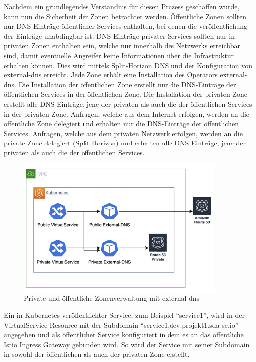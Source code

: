 Nachdem ein grundlegendes Verständnis für diesen Prozess geschaffen wurde, kann nun die Sicherheit der Zonen betrachtet werden.
Öffentliche Zonen sollten nur DNS-Einträge öffentlicher Services enthalten, bei denen die veröffentlichung der Einträge unabdingbar ist.
DNS-Einträge privater Services sollten nur in privaten Zonen enthalten sein, welche nur innerhalb des Netzwerks erreichbar sind, damit eventuelle Angreifer
keine Informationen über die Infrastruktur erhalten können.
Dies wird mittels Split-Horizon DNS und der Konfiguration von external-dns erreicht.
Jede Zone erhält eine Installation des Operators external-dns.
Die Installation der öffentlichen Zone erstellt nur die DNS-Einträge der öffentlichen Services in der öffentlichen Zone.
Die Installation der privaten Zone erstellt alle DNS-Einträge, jene der privaten als auch die der öffentlichen Services in der privaten Zone.
Anfragen, welche aus dem Internet erfolgen, werden an die öffentliche Zone delegiert und erhalten nur die DNS-Einträge der öffentlichen Services.
Anfragen, welche aus dem privaten Netzwerk erfolgen, werden an die private Zone delegiert (Split-Horizon) und erhalten alle DNS-Einträge, jene der privaten als auch die der öffentlichen Services.
\medskip

\begin{figure}[htbp]
    \centering
    \includegraphics[width=0.9\textwidth]{gfx/now-external-dns}
    \caption{Private und öffentliche Zonenverwaltung mit external-dns}
    \label{fig:Projektbeschreibung:external-dns}
\end{figure}

Ein in Kubernetes veröffentlichter Service, zum Beispiel \enquote{service1}, wird in der VirtualService Resource mit der Subdomain \enquote{service1.dev.projekt1.sda-se.io} angegeben und als öffentlicher Service konfiguriert in dem es an das öffentliche Istio Ingress Gateway gebunden wird.
So wird der Service mit seiner Subdomain in sowohl der öffentlichen als auch der privaten Zone erstellt.
\medskip

